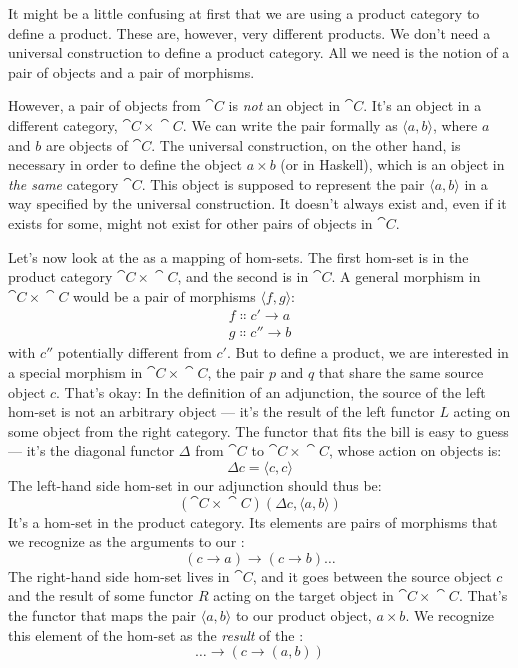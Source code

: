 \noindent
It might be a little confusing at first that we are using a product
category to define a product. These are, however, very different
products. We don't need a universal construction to define a product
category. All we need is the notion of a pair of objects and a pair of
morphisms.

However, a pair of objects from $\cat{C}$ is \emph{not} an object in
$\cat{C}$. It's an object in a different category, $\cat{C}\times{}\cat{C}$. We can
write the pair formally as $\langle a, b \rangle$,
where $a$ and $b$ are objects of $\cat{C}$. The universal
construction, on the other hand, is necessary in order to define the
object $a\times{}b$ (or  in Haskell), which is an object
in \emph{the same} category $\cat{C}$. This object is supposed to
represent the pair $\langle a, b \rangle$ in a way
specified by the universal construction. It doesn't always exist and,
even if it exists for some, might not exist for other pairs of objects
in $\cat{C}$.

Let's now look at the  as a mapping of hom-sets. The
first hom-set is in the product category $\cat{C}\times{}\cat{C}$, and the second is
in $\cat{C}$. A general morphism in $\cat{C}\times{}\cat{C}$ would be a pair of
morphisms $\langle f, g \rangle$:
\begin{gather*}
  f \Colon c' \to a \\
  g \Colon c'' \to b
\end{gather*}
with $c''$ potentially different from
$c'$. But to define a product, we are interested in a
special morphism in $\cat{C}\times{}\cat{C}$, the pair $p$ and $q$ that
share the same source object $c$. That's okay: In the definition
of an adjunction, the source of the left hom-set is not an arbitrary
object --- it's the result of the left functor $L$ acting on some
object from the right category. The functor that fits the bill is easy
to guess --- it's the diagonal functor $\Delta$ from $\cat{C}$ to $\cat{C}\times{}\cat{C}$,
whose action on objects is:
\[\Delta c = \langle c, c \rangle\]
The left-hand side hom-set in our adjunction should thus be:
\[(\cat{C}\times{}\cat{C})(\Delta c, \langle a, b \rangle)\]
It's a hom-set in the product category. Its elements are pairs of
morphisms that we recognize as the arguments to our :
\[(c \to a) \to (c \to b) \ldots{}\]
The right-hand side hom-set lives in $\cat{C}$, and it goes between the
source object $c$ and the result of some functor $R$
acting on the target object in $\cat{C}\times{}\cat{C}$. That's the functor that maps
the pair $\langle a, b \rangle$ to our product object,
$a\times{}b$. We recognize this element of the hom-set as the
\emph{result} of the :
\[\ldots{} \to (c \to (a, b))\]

